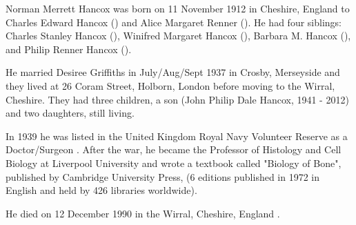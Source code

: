 
Norman Merrett Hancox was born on 11 November 1912 in Cheshire, England to Charles Edward Hancox () and Alice Margaret Renner (). He had four siblings:  Charles Stanley Hancox (),  Winifred Margaret Hancox (), Barbara M. Hancox (), and Philip Renner Hancox ().

He married Desiree Griffiths in July/Aug/Sept 1937 in Crosby, Merseyside \cite{NMHancoxMarriage} and they lived at 26 Coram Street, Holborn, London \cite{NMHancoxResidence} before moving to the Wirral, Cheshire. They had three children, a son (John Philip Dale Hancox, 1941 - 2012) and two daughters, still living.

In 1939 he was listed in the United Kingdom Royal Navy Volunteer Reserve as a  Doctor/Surgeon \cite{NMHancoxWar}.  After the war, he became the Professor of Histology and Cell Biology at Liverpool University and wrote a textbook called "Biology of Bone", published by Cambridge University Press, (6 editions published in 1972 in English and held by 426 libraries worldwide)\cite{NMHancoxBook}.

He died on 12 December 1990 in the	Wirral, Cheshire, England \cite{NMHancoxDeath}.

